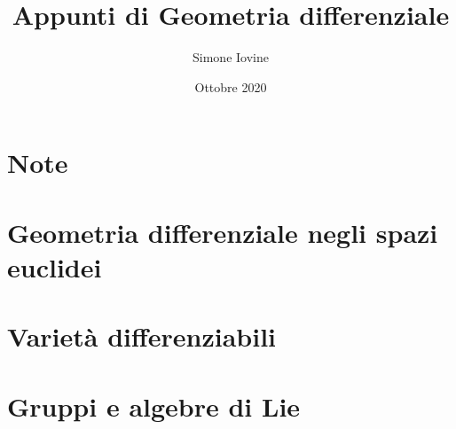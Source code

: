 \documentclass[12pt]{report}
\title{\textbf{Appunti di Geometria differenziale}}
\author{Simone Iovine}
\date{Ottobre 2020}
\begin{document}
	

\maketitle

%

\chapter*{Note}


%

\newpage

%

\tableofcontents

%

\newpage

%


%

\chapter{Geometria differenziale negli spazi euclidei}


%

\chapter{Varietà differenziabili}


%

\chapter{Gruppi e algebre di Lie}


%

\begin{appendices}
	\appendixtitleoff
	\appendixheaderoff
	
	
\end{appendices}

%

%

%

\end{document}
